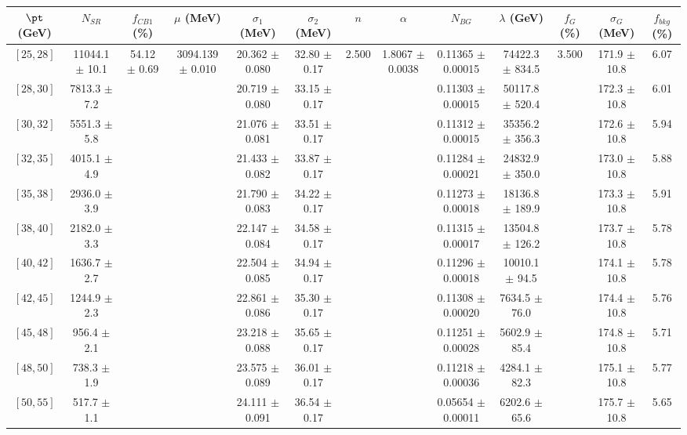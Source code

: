 \begin{tabular}{c||c|c|c|c|c|c|c|c|c|c|c||c}
$\pt$ (GeV) & $N_{SR}$ & $f_{CB1}$ (\%) & $\mu$ (MeV) & $\sigma_1$ (MeV) & $\sigma_2$ (MeV) & $n$ & $\alpha$ & $N_{BG}$ & $\lambda$ (GeV) & $f_G$ (\%) & $\sigma_G$ (MeV) & $f_{bkg}$ (\%) \\
\hline
$[25, 28]$ & 11044.1 $\pm$ 10.1 & \multirow{19}{*}{54.12 $\pm$ 0.69} & \multirow{19}{*}{3094.139 $\pm$ 0.010} & 20.362 $\pm$ 0.080 & 32.80 $\pm$ 0.17 & \multirow{19}{*}{2.500} & \multirow{19}{*}{1.8067 $\pm$ 0.0038} & 0.11365 $\pm$ 0.00015 & 74422.3 $\pm$ 834.5 & \multirow{19}{*}{3.500} & 171.9 $\pm$ 10.8 & 6.07\\
$[28, 30]$ & 7813.3 $\pm$ 7.2 &  &  & 20.719 $\pm$ 0.080 & 33.15 $\pm$ 0.17 &  &  & 0.11303 $\pm$ 0.00015 & 50117.8 $\pm$ 520.4 &  & 172.3 $\pm$ 10.8 & 6.01\\
$[30, 32]$ & 5551.3 $\pm$ 5.8 &  &  & 21.076 $\pm$ 0.081 & 33.51 $\pm$ 0.17 &  &  & 0.11312 $\pm$ 0.00015 & 35356.2 $\pm$ 356.3 &  & 172.6 $\pm$ 10.8 & 5.94\\
$[32, 35]$ & 4015.1 $\pm$ 4.9 &  &  & 21.433 $\pm$ 0.082 & 33.87 $\pm$ 0.17 &  &  & 0.11284 $\pm$ 0.00021 & 24832.9 $\pm$ 350.0 &  & 173.0 $\pm$ 10.8 & 5.88\\
$[35, 38]$ & 2936.0 $\pm$ 3.9 &  &  & 21.790 $\pm$ 0.083 & 34.22 $\pm$ 0.17 &  &  & 0.11273 $\pm$ 0.00018 & 18136.8 $\pm$ 189.9 &  & 173.3 $\pm$ 10.8 & 5.91\\
$[38, 40]$ & 2182.0 $\pm$ 3.3 &  &  & 22.147 $\pm$ 0.084 & 34.58 $\pm$ 0.17 &  &  & 0.11315 $\pm$ 0.00017 & 13504.8 $\pm$ 126.2 &  & 173.7 $\pm$ 10.8 & 5.78\\
$[40, 42]$ & 1636.7 $\pm$ 2.7 &  &  & 22.504 $\pm$ 0.085 & 34.94 $\pm$ 0.17 &  &  & 0.11296 $\pm$ 0.00018 & 10010.1 $\pm$ 94.5 &  & 174.1 $\pm$ 10.8 & 5.78\\
$[42, 45]$ & 1244.9 $\pm$ 2.3 &  &  & 22.861 $\pm$ 0.086 & 35.30 $\pm$ 0.17 &  &  & 0.11308 $\pm$ 0.00020 & 7634.5 $\pm$ 76.0 &  & 174.4 $\pm$ 10.8 & 5.76\\
$[45, 48]$ & 956.4 $\pm$ 2.1 &  &  & 23.218 $\pm$ 0.088 & 35.65 $\pm$ 0.17 &  &  & 0.11251 $\pm$ 0.00028 & 5602.9 $\pm$ 85.4 &  & 174.8 $\pm$ 10.8 & 5.71\\
$[48, 50]$ & 738.3 $\pm$ 1.9 &  &  & 23.575 $\pm$ 0.089 & 36.01 $\pm$ 0.17 &  &  & 0.11218 $\pm$ 0.00036 & 4284.1 $\pm$ 82.3 &  & 175.1 $\pm$ 10.8 & 5.77\\
$[50, 55]$ & 517.7 $\pm$ 1.1 &  &  & 24.111 $\pm$ 0.091 & 36.54 $\pm$ 0.17 &  &  & 0.05654 $\pm$ 0.00011 & 6202.6 $\pm$ 65.6 &  & 175.7 $\pm$ 10.8 & 5.65\\

\end{tabular}
